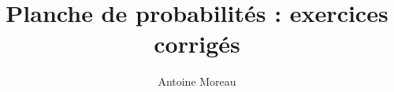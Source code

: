 \documentclass[a4paper,10pt]{article}
\title{Planche de probabilit\'es : exercices corrig\'es}
\author{Antoine Moreau}
\begin{document}
\maketitle

\begin{abstract}

\end{abstract}







\end{document}
